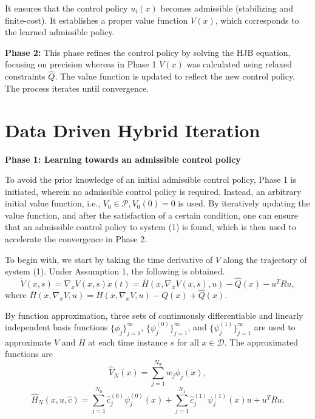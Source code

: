 \documentclass[12pt]{article}
\begin{document}
It ensures that the control policy \( u_i(x) \) becomes admissible (stabilizing and finite-cost). It establishes a proper value function \( V(x) \), which corresponds to the learned admissible policy.

\textbf{Phase 2:} This phase refines the control policy by solving the HJB equation, focusing on precision whereas in Phase 1 \(V(x)\) was calculated using relaxed constraints \(\hat{Q}\). The value function is updated to reflect the new control policy. The process iterates until convergence.

\section{Data Driven Hybrid Iteration}

\textbf{Phase 1: Learning towards an admissible control policy}

To avoid the prior knowledge of an initial admissible control policy, Phase 1 is initiated, wherein no admissible control policy is required. Instead, an arbitrary initial value function, i.e., \( V_0 \in \mathcal{P}, V_0(0) = 0 \) is used. By iteratively updating the value function, and after the satisfaction of a certain condition, one can ensure that an admissible control policy to system (1) is found, which is then used to accelerate the convergence in Phase 2.

To begin with, we start by taking the time derivative of \( V \) along the trajectory of system (1). Under Assumption 1, the following is obtained.
\[
\dot{V}(x, s) = \nabla_x V(x, s) \dot{x}(t) = \bar{H}(x, \nabla_x V(x, s), u) - \hat{Q}(x) - u^T R u,
\]
where \( \bar{H}(x, \nabla_x V, u) = H(x, \nabla_x V, u) - Q(x) + \hat{Q}(x) \).

By function approximation, three sets of continuously differentiable and linearly independent basis functions \( \{ \phi_j \}_{j=1}^{\infty} \), \( \{ \psi_j^{(0)} \}_{j=1}^{\infty} \), and \( \{ \psi_j^{(1)} \}_{j=1}^{\infty} \) are used to approximate \( V \) and \( \bar{H} \) at each time instance \( s \) for all \( x \in \mathcal{D} \). The approximated functions are
\[
\hat{V}_N(x) = \sum_{j=1}^{N_w} \hat{w}_j \phi_j(x),
\]
\[
\hat{H}_N(x, u, \hat{c}) = \sum_{j=1}^{N_0} \hat{c}_j^{(0)} \psi_j^{(0)}(x) + \sum_{j=1}^{N_1} \hat{c}_j^{(1)} \psi_j^{(1)}(x) u + u^T R u.
\]
\end{document}
